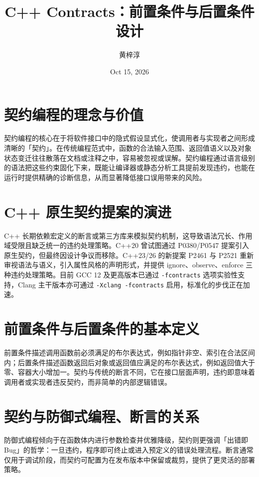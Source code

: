 \title{C++ Contracts：前置条件与后置条件设计}
\author{黄梓淳}
\date{Oct 15, 2026}
\maketitle
\chapter{契约编程的理念与价值}
契约编程的核心在于将软件接口中的隐式假设显式化，使调用者与实现者之间形成清晰的「契约」。在传统编程范式中，函数的合法输入范围、返回值语义以及对象状态变迁往往散落在文档或注释之中，容易被忽视或误解。契约编程通过语言级别的语法把这些约束固化下来，既能让编译器或静态分析工具提前发现违约，也能在运行时提供精确的诊断信息，从而显著降低接口误用带来的风险。\par
\chapter{C++ 原生契约提案的演进}
C++ 长期依赖宏定义的断言或第三方库来模拟契约机制，这导致语法冗长、作用域受限且缺乏统一的违约处理策略。C++20 曾试图通过 P0380/P0547 提案引入原生契约，但最终因设计争议而移除。C++23/26 的新提案 P2461 与 P2521 重新审视语法与语义，引入属性风格的声明形式，并提供 ignore、observe、enforce 三种违约处理策略。目前 GCC 12 及更高版本已通过 \texttt{-fcontracts} 选项实验性支持，Clang 主干版本亦可通过 \texttt{-Xclang -fcontracts} 启用，标准化的步伐正在加速。\par
\chapter{前置条件与后置条件的基本定义}
前置条件描述调用函数前必须满足的布尔表达式，例如指针非空、索引在合法区间内；后置条件描述函数返回后对象或返回值应满足的布尔表达式，例如返回值大于零、容器大小增加一。契约与传统的断言不同，它在接口层面声明，违约即意味着调用者或实现者违反契约，而非简单的内部逻辑错误。\par
\chapter{契约与防御式编程、断言的关系}
防御式编程倾向于在函数体内进行参数检查并优雅降级，契约则更强调「出错即 Bug」的哲学：一旦违约，程序即可终止或进入预定义的错误处理流程。断言通常仅用于调试阶段，而契约可配置为在发布版本中保留或裁剪，提供了更灵活的部署策略。\par
